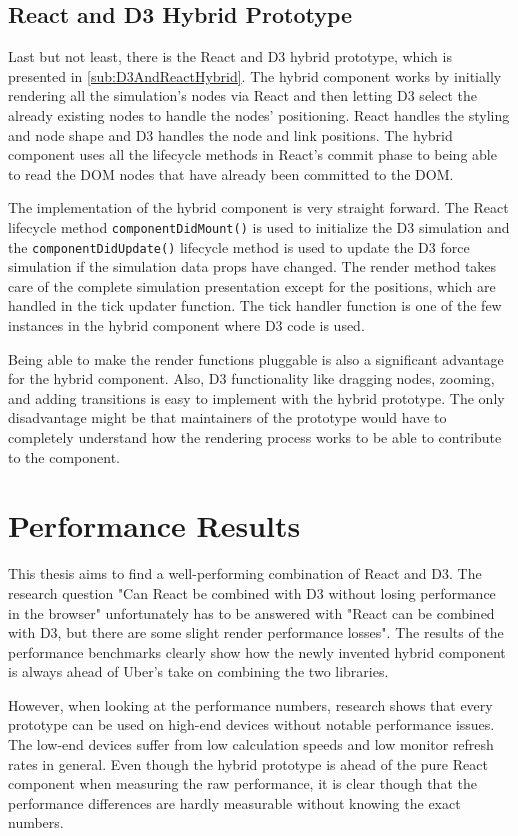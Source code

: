 \subsection{React and D3 Hybrid Prototype}

Last but not least, there is the React and D3 hybrid prototype, which is presented in \ref{sub:D3AndReactHybrid}. The hybrid component works by initially rendering all the simulation's nodes via React and then letting D3 select the already existing nodes to handle the nodes' positioning. React handles the styling and node shape and D3 handles the node and link positions. The hybrid component uses all the lifecycle methods in React's commit phase to being able to read the DOM nodes that have already been committed to the DOM. 

The implementation of the hybrid component is very straight forward. The React lifecycle method \texttt{componentDidMount()} is used to initialize the D3 simulation and the \texttt{componentDidUpdate()} lifecycle method is used to update the D3 force simulation if the simulation data props have changed. The render method takes care of the complete simulation presentation except for the positions, which are handled in the tick updater function. The tick handler function is one of the few instances in the hybrid component where D3 code is used.

Being able to make the render functions pluggable is also a significant advantage for the hybrid component. Also, D3 functionality like dragging nodes, zooming, and adding transitions is easy to implement with the hybrid prototype. The only disadvantage might be that maintainers of the prototype would have to completely understand how the rendering process works to be able to contribute to the component.

\section{Performance Results}

This thesis aims to find a well-performing combination of React and D3. The research question "Can React be combined with D3 without losing performance in the browser" unfortunately has to be answered with "React can be combined with D3, but there are some slight render performance losses". The results of the performance benchmarks clearly show how the newly invented hybrid component is always ahead of Uber's take on combining the two libraries. 

However, when looking at the performance numbers, research shows that every prototype can be used on high-end devices without notable performance issues. The low-end devices suffer from low calculation speeds and low monitor refresh rates in general. Even though the hybrid prototype is ahead of the pure React component when measuring the raw performance, it is clear though that the performance differences are hardly measurable without knowing the exact numbers.

